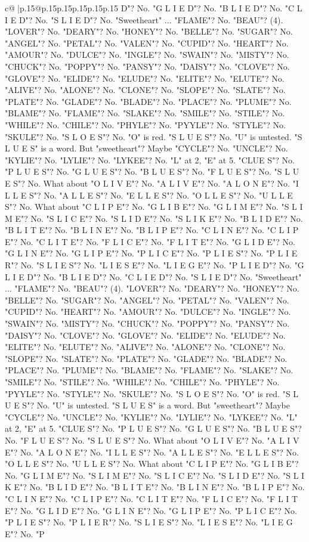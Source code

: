 \documentclass{article}
\begin{document}
{\begin{supertabular}{c@{$\;$}|p{.15\linewidth}@{}p{.15\linewidth}p{.15\linewidth}p{.15\linewidth}p{.15\linewidth}p{.15\linewidth}}
{{{D"? No. "G L I E D"? No. "B L I E D"? No. "C L I E D"? No. "S L I E D"? No. "Sweetheart" ... "FLAME"? No. "BEAU"? (4). "LOVER"? No. "DEARY"? No. "HONEY"? No. "BELLE"? No. "SUGAR"? No. "ANGEL"? No. "PETAL"? No. "VALEN"? No. "CUPID"? No. "HEART"? No. "AMOUR"? No. "DULCE"? No. "INGLE"? No. "SWAIN"? No. "MISTY"? No. "CHUCK"? No. "POPPY"? No. "PANSY"? No. "DAISY"? No. "CLOVE"? No. "GLOVE"? No. "ELIDE"? No. "ELUDE"? No. "ELITE"? No. "ELUTE"? No. "ALIVE"? No. "ALONE"? No. "CLONE"? No. "SLOPE"? No. "SLATE"? No. "PLATE"? No. "GLADE"? No. "BLADE"? No. "PLACE"? No. "PLUME"? No. "BLAME"? No. "FLAME"? No. "SLAKE"? No. "SMILE"? No. "STILE"? No. "WHILE"? No. "CHILE"? No. "PHYLE"? No. "PYYLE"? No. "STYLE"? No. "SKULE"? No. "S L O E S"? No. "O" is red. "S L U E S"? No. "U" is untested. "S L U E S" is a word. But "sweetheart"? Maybe "CYCLE"? No. "UNCLE"? No. "KYLIE"? No. "LYLIE"? No. "LYKEE"? No. "L" at 2, "E" at 5. "CLUE S"? No. "P L U E S"? No. "G L U E S"? No. "B L U E S"? No. "F L U E S"? No. "S L U E S"? No. What about "O L I V E"? No. "A L I V E"? No. "A L O N E"? No. "I L L E S"? No. "A L L E S"? No. "E L L E S"? No. "O L L E S"? No. "U L L E S"? No. What about "C L I P E"? No. "G L I B E"? No. "G L I M E"? No. "S L I M E"? No. "S L I C E"? No. "S L I D E"? No. "S L I K E"? No. "B L I D E"? No. "B L I T E"? No. "B L I N E"? No. "B L I P E"? No. "C L I N E"? No. "C L I P E"? No. "C L I T E"? No. "F L I C E"? No. "F L I T E"? No. "G L I D E"? No. "G L I N E"? No. "G L I P E"? No. "P L I C E"? No. "P L I E S"? No. "P L I E R"? No. "S L I E S"? No. "L I E S E"? No. "L I E G E"? No. "P L I E D"? No. "G L I E D"? No. "B L I E D"? No. "C L I E D"? No. "S L I E D"? No. "Sweetheart" ... "FLAME"? No. "BEAU"? (4). "LOVER"? No. "DEARY"? No. "HONEY"? No. "BELLE"? No. "SUGAR"? No. "ANGEL"? No. "PETAL"? No. "VALEN"? No. "CUPID"? No. "HEART"? No. "AMOUR"? No. "DULCE"? No. "INGLE"? No. "SWAIN"? No. "MISTY"? No. "CHUCK"? No. "POPPY"? No. "PANSY"? No. "DAISY"? No. "CLOVE"? No. "GLOVE"? No. "ELIDE"? No. "ELUDE"? No. "ELITE"? No. "ELUTE"? No. "ALIVE"? No. "ALONE"? No. "CLONE"? No. "SLOPE"? No. "SLATE"? No. "PLATE"? No. "GLADE"? No. "BLADE"? No. "PLACE"? No. "PLUME"? No. "BLAME"? No. "FLAME"? No. "SLAKE"? No. "SMILE"? No. "STILE"? No. "WHILE"? No. "CHILE"? No. "PHYLE"? No. "PYYLE"? No. "STYLE"? No. "SKULE"? No. "S L O E S"? No. "O" is red. "S L U E S"? No. "U" is untested. "S L U E S" is a word. But "sweetheart"? Maybe "CYCLE"? No. "UNCLE"? No. "KYLIE"? No. "LYLIE"? No. "LYKEE"? No. "L" at 2, "E" at 5. "CLUE S"? No. "P L U E S"? No. "G L U E S"? No. "B L U E S"? No. "F L U E S"? No. "S L U E S"? No. What about "O L I V E"? No. "A L I V E"? No. "A L O N E"? No. "I L L E S"? No. "A L L E S"? No. "E L L E S"? No. "O L L E S"? No. "U L L E S"? No. What about "C L I P E"? No. "G L I B E"? No. "G L I M E"? No. "S L I M E"? No. "S L I C E"? No. "S L I D E"? No. "S L I K E"? No. "B L I D E"? No. "B L I T E"? No. "B L I N E"? No. "B L I P E"? No. "C L I N E"? No. "C L I P E"? No. "C L I T E"? No. "F L I C E"? No. "F L I T E"? No. "G L I D E"? No. "G L I N E"? No. "G L I P E"? No. "P L I C E"? No. "P L I E S"? No. "P L I E R"? No. "S L I E S"? No. "L I E S E"? No. "L I E G E"? No. "P }}}
\end{supertabular}}
\end{document}
